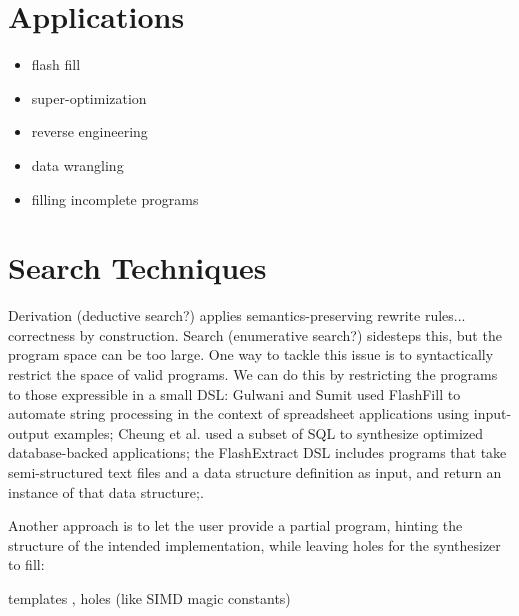 \section{Applications}
\label{sec:applications}

\begin{itemize}
\item flash fill
\item super-optimization
\item reverse engineering
\item data wrangling
\item filling incomplete programs
\end{itemize}

\section{Search Techniques}
\label{sec:search-techniques}

 Derivation (deductive search?) applies
semantics-preserving rewrite rules... correctness by construction.
Search (enumerative search?) sidesteps this, but the program space can be too large.
One way to tackle this issue is to syntactically restrict the space of valid
programs. We can do this by restricting the programs to those expressible in a
small DSL:
 Gulwani and Sumit \cite{Gulwani:2011}
used FlashFill to automate string processing in the context of spreadsheet
applications using input-output examples;
Cheung et al. \cite{Cheung:2013} used a subset of SQL to synthesize optimized
database-backed applications;
the FlashExtract DSL \cite{Le:2014} includes programs that take semi-structured
text files and a data structure definition as input, and return an instance of
that data structure;.

Another approach is to let the user provide a partial program, hinting the
structure of the intended implementation, while leaving holes for the
synthesizer to fill:

templates \cite{Srivastava:2012},
holes (like SIMD magic constants) \cite{Solar-Lezama:2008}


